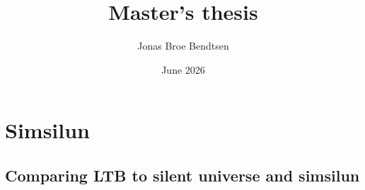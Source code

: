 \documentclass[11pt, a4paper, openany]{book}%
\title{Master's thesis}
\author{Jonas Broe Bendtsen}
\date{June 2026}
\numberwithin{equation}{chapter}
\begin{document}
\maketitle
\tableofcontents
\chapter{Simsilun}
\section{Comparing LTB to silent universe and simsilun}\label{sec:LTBvsSimsilun}

\end{document}
